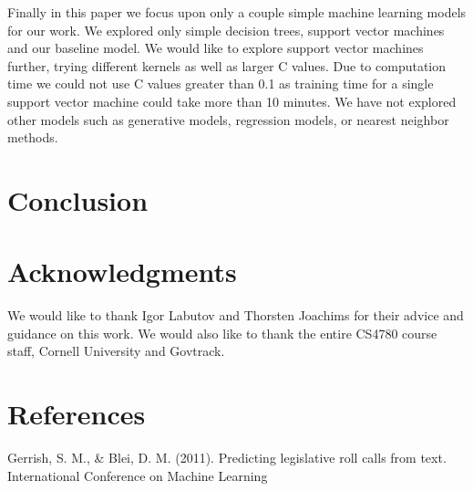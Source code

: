 \documentclass[11pt,letterpaper,twocolumn]{article}
\begin{document}
Finally in this paper we focus upon only a couple simple machine learning models for our work. We explored only simple decision trees, support vector machines and our baseline model. We would like to explore support vector machines further, trying different kernels as well as larger C values. Due to computation time we could not use C values greater than 0.1 as training time for a single support vector machine could take more than 10 minutes. We have not explored other models such as generative models, regression models, or nearest neighbor methods.

\section{Conclusion}

\section*{Acknowledgments}

We would like to thank Igor Labutov and Thorsten Joachims for their advice and guidance on this work. We would also like to thank the entire CS4780 course staff, Cornell University and Govtrack. 

\pagebreak

\section*{References}

Gerrish, S. M., \& Blei, D. M. (2011). Predicting legislative roll calls from text. International Conference on Machine Learning
\end{document}
